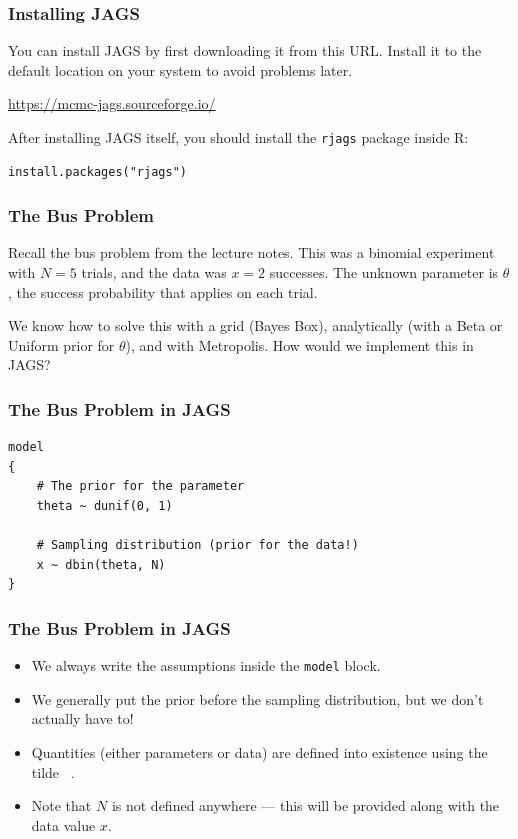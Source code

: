 \documentclass{beamer}
\begin{document}
\begin{frame}[fragile]
\frametitle{Installing JAGS}
You can install JAGS by first downloading it from this URL. Install it to
the default location on your system to avoid problems later.

\begin{center}
\url{https://mcmc-jags.sourceforge.io/}
\end{center}

\pause

After installing JAGS itself, you should install the \texttt{rjags}
package inside R:
\begin{verbatim}
install.packages("rjags")
\end{verbatim}

\end{frame}


\begin{frame}[fragile]
\frametitle{The Bus Problem}
Recall the bus problem from the lecture notes. This was a binomial experiment
with $N=5$ trials, and the data was $x=2$ successes. The unknown parameter
is $\theta$, the success probability that applies on each trial.

\pause

We know how to solve this with a grid (Bayes Box), analytically (with a Beta
or Uniform prior for $\theta$), and with Metropolis.
How would we implement this in JAGS?

\end{frame}


\begin{frame}[fragile]
\frametitle{The Bus Problem in JAGS}

\begin{verbatim}
model
{
    # The prior for the parameter
    theta ~ dunif(0, 1)

    # Sampling distribution (prior for the data!)
    x ~ dbin(theta, N)
}
\end{verbatim}

\end{frame}

\begin{frame}[fragile]
\frametitle{The Bus Problem in JAGS}
\begin{itemize}
\item We always write the assumptions inside the \texttt{model} block.\pause
\item We generally put the prior before the sampling distribution, but we don't
    actually have to!\pause
\item Quantities (either parameters or data) are defined into existence using
the tilde \texttt{~}.\pause
\item Note that $N$ is not defined anywhere --- this will be provided along
with the data value $x$.
\end{itemize}

\end{frame}
\end{document}
